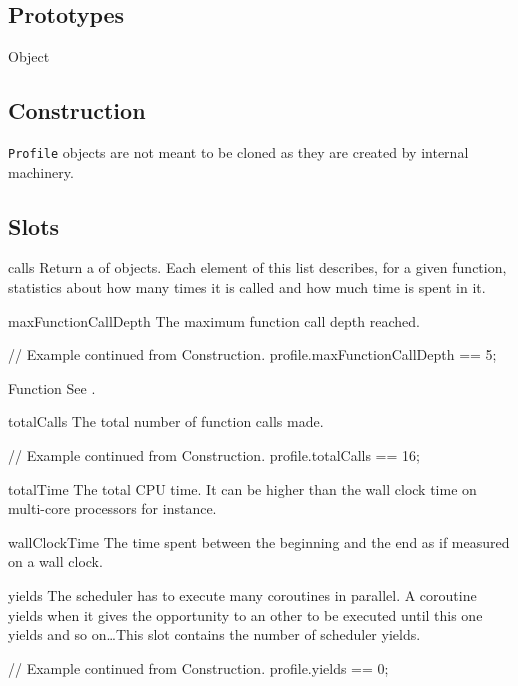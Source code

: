 \subsection{Prototypes}

\begin{refObjects}
\item[Object]
\end{refObjects}

\subsection{Construction}

\lstinline|Profile| objects are not meant to be cloned as they are created
by  internal machinery.

\subsection{Slots}

\begin{urbiscriptapi}

\item[calls]%
  Return a  of  objects. Each
  element of this list describes, for a given function, statistics about how
  many times it is called and how much time is spent in it.

\item[maxFunctionCallDepth]%
  The maximum function call depth reached.
\begin{urbiassert}
// Example continued from Construction.
profile.maxFunctionCallDepth == 5;
\end{urbiassert}

\item[Function] See .

\item[totalCalls]%
  The total number of function calls made.
\begin{urbiassert}
// Example continued from Construction.
profile.totalCalls == 16;
\end{urbiassert}

\item[totalTime]%
  The total CPU time. It can be higher than the wall clock time on
  multi-core processors for instance.

\item[wallClockTime]%
  The time spent between the beginning and the end as if measured on a wall
  clock.

\item[yields]%
  The scheduler has to execute many coroutines in parallel. A coroutine
  yields when it gives the opportunity to an other to be executed until this
  one yields and so on\dots This slot contains the number of scheduler
  yields.
\begin{urbiassert}
// Example continued from Construction.
profile.yields == 0;
\end{urbiassert}
\end{urbiscriptapi}


